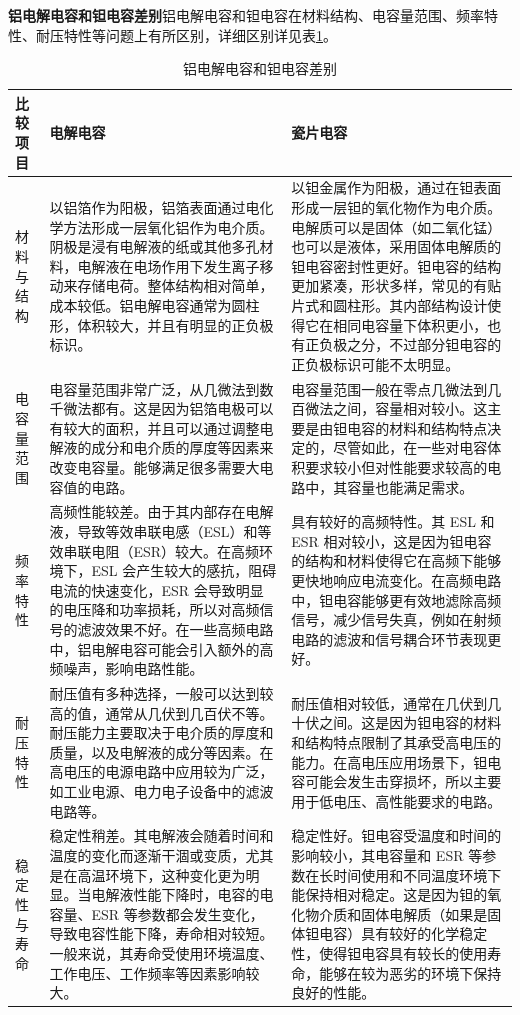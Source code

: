 \documentclass[./测控三级项目.tex]{subfiles} %
\begin{document}
	\textbf{铝电解电容和钽电容差别}\quad 铝电解电容和钽电容在材料结构、电容量范围、频率特性、耐压特性等问题上有所区别，详细区别详见表\ref{tab:铝电解电容和钽电容差别}。
	\begin{table}[H]
		\centering
		\caption{铝电解电容和钽电容差别}
		\label{tab:铝电解电容和钽电容差别}
		\begin{tabular}{|p{2.5cm}|p{7cm}|p{7cm}|}
			\hline
			比较项目 & 电解电容  & 瓷片电容 \\
			\hline
			材料与结构 & 以铝箔作为阳极，铝箔表面通过电化学方法形成一层氧化铝作为电介质。阴极是浸有电解液的纸或其他多孔材料，电解液在电场作用下发生离子移动来存储电荷。整体结构相对简单，成本较低。铝电解电容通常为圆柱形，体积较大，并且有明显的正负极标识。 & 以钽金属作为阳极，通过在钽表面形成一层钽的氧化物作为电介质。电解质可以是固体（如二氧化锰）也可以是液体，采用固体电解质的钽电容密封性更好。钽电容的结构更加紧凑，形状多样，常见的有贴片式和圆柱形。其内部结构设计使得它在相同电容量下体积更小，也有正负极之分，不过部分钽电容的正负极标识可能不太明显。\\
			\hline
			电容量范围 & 电容量范围非常广泛，从几微法到数千微法都有。这是因为铝箔电极可以有较大的面积，并且可以通过调整电解液的成分和电介质的厚度等因素来改变电容量。能够满足很多需要大电容值的电路。 & 电容量范围一般在零点几微法到几百微法之间，容量相对较小。这主要是由钽电容的材料和结构特点决定的，尽管如此，在一些对电容体积要求较小但对性能要求较高的电路中，其容量也能满足需求。\\
			\hline
			频率特性 & 高频性能较差。由于其内部存在电解液，导致等效串联电感（ESL）和等效串联电阻（ESR）较大。在高频环境下，ESL 会产生较大的感抗，阻碍电流的快速变化，ESR 会导致明显的电压降和功率损耗，所以对高频信号的滤波效果不好。在一些高频电路中，铝电解电容可能会引入额外的高频噪声，影响电路性能。 & 具有较好的高频特性。其 ESL 和 ESR 相对较小，这是因为钽电容的结构和材料使得它在高频下能够更快地响应电流变化。在高频电路中，钽电容能够更有效地滤除高频信号，减少信号失真，例如在射频电路的滤波和信号耦合环节表现更好。 \\
			\hline
			耐压特性 & 耐压值有多种选择，一般可以达到较高的值，通常从几伏到几百伏不等。耐压能力主要取决于电介质的厚度和质量，以及电解液的成分等因素。在高电压的电源电路中应用较为广泛，如工业电源、电力电子设备中的滤波电路等。& 耐压值相对较低，通常在几伏到几十伏之间。这是因为钽电容的材料和结构特点限制了其承受高电压的能力。在高电压应用场景下，钽电容可能会发生击穿损坏，所以主要用于低电压、高性能要求的电路。 \\
			\hline
			稳定性与寿命&	稳定性稍差。其电解液会随着时间和温度的变化而逐渐干涸或变质，尤其是在高温环境下，这种变化更为明显。当电解液性能下降时，电容的电容量、ESR 等参数都会发生变化，导致电容性能下降，寿命相对较短。一般来说，其寿命受使用环境温度、工作电压、工作频率等因素影响较大。 &	稳定性好。钽电容受温度和时间的影响较小，其电容量和 ESR 等参数在长时间使用和不同温度环境下能保持相对稳定。这是因为钽的氧化物介质和固体电解质（如果是固体钽电容）具有较好的化学稳定性，使得钽电容具有较长的使用寿命，能够在较为恶劣的环境下保持良好的性能。\\

\end{tabular}
\end{table}
\end{document}

